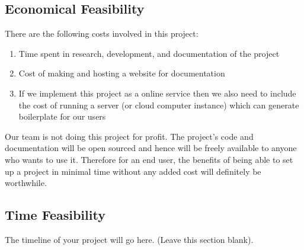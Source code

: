 \subsection{Economical Feasibility}
There are the following costs involved in this project:
\begin{enumerate}
  \item Time spent in research, development, and documentation of the project
  \item Cost of making and hosting a website for documentation
  \item If we implement this project as a online service then we also need to include the cost of running a server (or cloud computer instance) which can generate boilerplate for our users
\end{enumerate}
Our team is not doing this project for profit. The project's code and documentation will be open sourced and hence will be freely available to anyone who wants to use it. Therefore for an end user, the benefits of being able to set up a project in minimal time without any added cost will definitely be worthwhile.

\subsection{Time Feasibility}
The timeline of your project will go here. (Leave this section blank).
